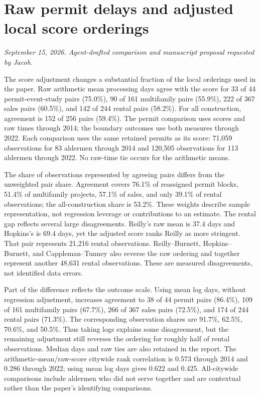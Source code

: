 \clearpage
\section*{Raw permit delays and adjusted local score orderings}
\textit{September 15, 2026. Agent-drafted comparison and manuscript proposal requested by Jacob.}

The score adjustment changes a substantial fraction of the local orderings
used in the paper. Raw arithmetic mean processing days agree with the
score for 33 of 44 permit-event-study pairs (75.0\%), 90 of 161 multifamily
pairs (55.9\%), 222 of 367 sales pairs (60.5\%), and 142 of 244 rental pairs
(58.2\%). For all construction, agreement is 152 of 256 pairs (59.4\%).
The permit comparison uses scores and raw times through 2014; the boundary
outcomes use both measures through 2022. Each comparison uses the same
retained permits as its score: 71,059 observations for 83 aldermen through
2014 and 120,505 observations for 113 aldermen through 2022. No raw-time
tie occurs for the arithmetic means.

The share of observations represented by agreeing pairs differs from the
unweighted pair share. Agreement covers 76.1\% of reassigned permit blocks,
51.4\% of multifamily projects, 57.1\% of sales, and only 39.1\% of rental
observations; the all-construction share is 53.2\%. These weights describe
sample representation, not regression leverage or contributions to an
estimate. The rental gap reflects several large disagreements. Reilly's
raw mean is 37.4 days and Hopkins's is 69.4 days, yet the adjusted score
ranks Reilly as more stringent. That pair represents 21,216 rental
observations. Reilly--Burnett, Hopkins--Burnett, and Cappleman--Tunney also
reverse the raw ordering and together represent another 48,631 rental
observations. These are measured disagreements, not identified data errors.

Part of the difference reflects the outcome scale. Using mean log days,
without regression adjustment, increases agreement to 38 of 44 permit pairs
(86.4\%), 109 of 161 multifamily pairs (67.7\%), 266 of 367 sales pairs
(72.5\%), and 174 of 244 rental pairs (71.3\%). The corresponding
observation shares are 91.7\%, 62.5\%, 70.6\%, and 50.5\%. Thus taking
logs explains some disagreement, but the remaining adjustment still
reverses the ordering for roughly half of rental observations. Median days
and raw ties are also retained in the report. The arithmetic-mean/raw-score
citywide rank correlation is 0.573 through 2014 and 0.286 through 2022;
using mean log days gives 0.622 and 0.425. All-citywide comparisons include
aldermen who did not serve together and are contextual rather than the
paper's identifying comparisons.


